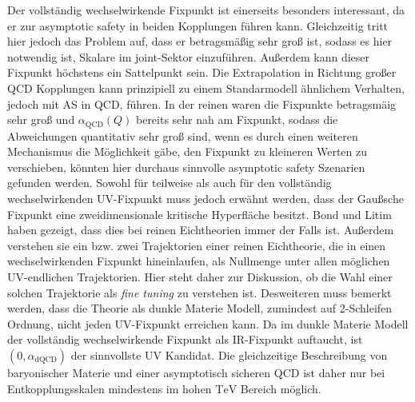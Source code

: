   Der vollständig wechselwirkende Fixpunkt ist einerseits besonders interessant, 
  da er zur asymptotic safety in beiden Kopplungen führen kann. 
  Gleichzeitig tritt hier jedoch das Problem auf, dass er betragsmäßig sehr 
  groß ist, sodass es hier notwendig ist, Skalare im joint-Sektor 
  einzuführen. Außerdem kann dieser Fixpunkt höchstens ein Sattelpunkt sein. 
  Die Extrapolation in Richtung großer QCD Kopplungen kann 
  prinzipiell zu einem Standarmodell ähnlichem Verhalten, jedoch 
  mit AS in QCD, führen. In der reinen \QCDxdQCD waren die 
  Fixpunkte betragsmäig sehr groß und $\alpha_\text{QCD}(Q)$ bereits sehr 
  nah am Fixpunkt, sodass die Abweichungen quantitativ sehr groß sind, wenn es 
  durch einen weiteren Mechanismus die Möglichkeit gäbe, den Fixpunkt zu 
  kleineren Werten zu verschieben, könnten hier durchaus sinnvolle 
  asymptotic safety Szenarien gefunden werden.
  Sowohl für teilweise als auch für den vollständig wechselwirkenden 
  UV-Fixpunkt muss jedoch erwähnt werden, dass der Gaußsche Fixpunkt eine 
  zweidimensionale kritische Hyperfläche besitzt. Bond und Litim haben 
  gezeigt, dass dies bei reinen Eichtheorien immer der Falls ist. Außerdem 
  verstehen sie ein bzw. zwei Trajektorien einer reinen Eichtheorie, die in 
  einen wechselwirkenden 
  Fixpunkt 
  hineinlaufen, als Nullmenge unter allen möglichen UV-endlichen Trajektorien. 
  Hier steht daher zur Diskussion, ob die Wahl einer solchen Trajektorie als 
  \textit{fine tuning} zu verstehen ist. Desweiteren muss bemerkt werden, 
  dass die Theorie als dunkle Materie Modell, zumindest auf 2-Schleifen 
  Ordnung, nicht jeden UV-Fixpunkt erreichen kann. Da im dunkle Materie 
  Modell der vollständig wechselwirkende Fixpunkt als IR-Fixpunkt auftaucht, 
  ist $(0,\alpha_\text{dQCD})$ der sinnvollste UV Kandidat. Die gleichzeitige 
  Beschreibung von baryonischer Materie und einer asymptotisch sicheren QCD 
  ist daher nur bei Entkopplungsskalen mindestens im hohen 
  $\text{TeV}$ Bereich möglich.
  
  